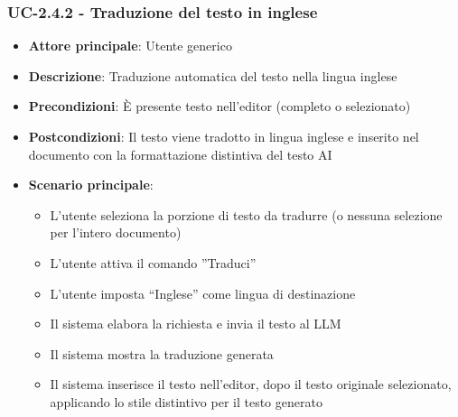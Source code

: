 \documentclass[11pt,a4paper]{article}
\begin{document}
\subsubsection{UC-2.4.2 - Traduzione del testo in inglese}
\begin{itemize}
    \item \textbf{Attore principale}: Utente generico
    \item \textbf{Descrizione}: Traduzione automatica del testo nella lingua inglese
    \item \textbf{Precondizioni}: È presente testo nell’editor (completo o selezionato)
    \item \textbf{Postcondizioni}: Il testo viene tradotto in lingua inglese e inserito nel documento con la formattazione distintiva del testo AI
    \item \textbf{Scenario principale}:
    \begin{itemize}
        \item L’utente seleziona la porzione di testo da tradurre (o nessuna selezione per l'intero documento)
        \item L’utente attiva il comando ”Traduci”
        \item L’utente imposta “Inglese” come lingua di destinazione
        \item Il sistema elabora la richiesta e invia il testo al LLM
        \item Il sistema mostra la traduzione generata
        \item Il sistema inserisce il testo nell'editor, dopo il testo originale selezionato, applicando lo stile distintivo per il testo generato
    \end{itemize}
\end{itemize}
\end{document}
